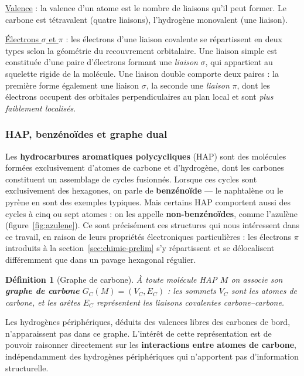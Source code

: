 \documentclass[11pt,a4paper]{article}
\newtheorem{definition}{Définition}
\begin{document}
\underline{Valence} : la valence d'un atome est le nombre de liaisons
qu'il peut former. Le carbone est tétravalent (quatre liaisons),
l'hydrogène monovalent (une liaison).

\underline{Électrons $\sigma$ et $\pi$} : les électrons d'une liaison
covalente se répartissent en deux types selon la géométrie du
recouvrement orbitalaire. Une liaison simple est constituée d'une paire
d'électrons formant une \emph{liaison} $\sigma$, qui appartient au
squelette rigide de la molécule. Une liaison double comporte deux
paires : la première forme également une liaison $\sigma$, la seconde
une \emph{liaison} $\pi$, dont les électrons occupent des orbitales
perpendiculaires au plan local et sont \emph{plus faiblement
localisés}.

\subsubsection{HAP, benzénoïdes et graphe dual}
\label{sec:dual}

Les \textbf{hydrocarbures aromatiques polycycliques} (HAP) sont des
molécules formées exclusivement d'atomes de carbone et d'hydrogène, dont
les carbones constituent un assemblage de cycles fusionnés. Lorsque ces
cycles sont exclusivement des hexagones, on parle de \textbf{benzénoïde}
--- le naphtalène ou le pyrène en sont des exemples typiques. Mais
certains HAP comportent aussi des cycles à cinq ou sept atomes : on les
appelle \textbf{non-benzénoïdes}, comme l'azulène
(figure~\ref{fig:azulene}). Ce sont précisément ces structures qui nous
intéressent dans ce travail, en raison de leurs propriétés électroniques
particulières : les électrons $\pi$ introduits à la
section~\ref{sec:chimie-prelim} s'y répartissent et se délocalisent
différemment que dans un pavage hexagonal régulier.

\begin{definition}[Graphe de carbone]
À toute molécule HAP $M$ on associe son \textbf{graphe de carbone}
$G_C(M) = (V_C, E_C)$ : les sommets $V_C$ sont les atomes de carbone,
et les arêtes $E_C$ représentent les liaisons covalentes
carbone--carbone.
\end{definition}

Les hydrogènes périphériques, déduits des valences libres des carbones
de bord, n'apparaissent pas dans ce graphe. L'intérêt de cette
représentation est de pouvoir raisonner directement sur les
\textbf{interactions entre atomes de carbone}, indépendamment des
hydrogènes périphériques qui n'apportent pas d'information
structurelle.
\end{document}
